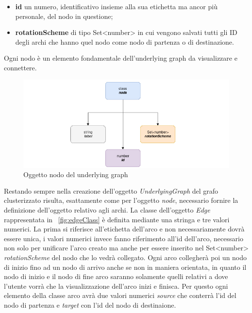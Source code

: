 {\begin{itemize}
	\item \textbf{id} un numero, identificativo insieme alla sua etichetta ma ancor più personale, del nodo in questione;
	\item \textbf{rotationScheme} di tipo Set<number> in cui vengono salvati tutti gli ID degli archi che hanno quel nodo come nodo di partenza o di destinazione.
\end{itemize}
Ogni nodo è un elemento fondamentale dell'underlying graph da visualizzare e connettere.
\begin{figure}[!htb]
	\begin{center}
		\includegraphics[width=1 \linewidth]{figure/nodeClass}
	\end{center}
	\caption{Oggetto nodo del underlying graph\label{fig:nodeClass}}
\end{figure}
Restando sempre nella creazione dell'oggetto \textit{UnderlyingGraph} del grafo clusterizzato risulta, esattamente come per l'oggetto \textit{node}, necessario fornire la definizione dell'oggetto relativo agli archi.
La classe dell'oggetto \textit{Edge} rappresentata in \figurename~\ref{fig:edgeClass} è definita mediante una stringa e tre valori numerici. La prima si riferisce all'etichetta dell'arco e non necessariamente dovrà essere unica, i valori numerici invece fanno riferimento all'id dell'arco, necessario non solo per unificare l'arco creato ma anche per essere inserito nel Set<number> \textit{rotationScheme} del nodo che lo vedrà collegato. Ogni arco collegherà poi un nodo di inizio fino ad un nodo di arrivo anche se non in maniera orientata, in quanto il nodo di inizio e il nodo di fine arco saranno solamente quelli relativi a dove l'utente vorrà che la visualizzazione dell'arco inizi e finisca. Per questo ogni elemento della classe arco avrà due valori numerici \textit{source} che conterrà l'id del nodo di partenza e \textit{target} con l'id del nodo di destinaione. 
\begin{figure}[!htb]
	\begin{center}

\end{center}
\end{figure}}
